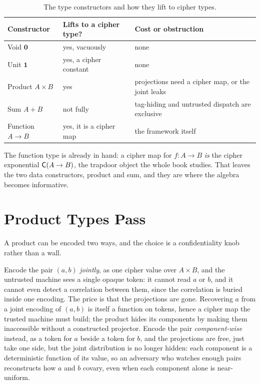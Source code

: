 \begin{table}[t]
\centering
\caption{The type constructors and how they lift to cipher types.}
\label{tab:constructors}
\begin{tabular}{@{}lll@{}}
\toprule
Constructor & Lifts to a cipher type? & Cost or obstruction \\
\midrule
Void $\mathbf{0}$ & yes, vacuously & none \\
Unit $\mathbf{1}$ & yes, a cipher constant & none \\
Product $A \times B$ & yes & projections need a cipher map, or the joint leaks \\
Sum $A + B$ & not fully & tag-hiding and untrusted dispatch are exclusive \\
Function $A \to B$ & yes, it is a cipher map & the framework itself \\
\bottomrule
\end{tabular}
\end{table}

The function type is already in hand: a cipher map for $f : A \to B$
\emph{is} the cipher exponential $\mathsf{C}(A \to B)$, the trapdoor object the
whole book studies. That leaves the two data constructors, product and sum,
and they are where the algebra becomes informative.

\section{Product Types Pass}
\label{sec:product-types}

A product can be encoded two ways, and the choice is a confidentiality knob
rather than a wall.

Encode the pair $(a, b)$ \emph{jointly}, as one cipher value over
$A \times B$, and the untrusted machine sees a single opaque token: it
cannot read $a$ or $b$, and it cannot even detect a correlation between
them, since the correlation is buried inside one encoding. The price is
that the projections are gone. Recovering $a$ from a joint encoding of
$(a, b)$ is itself a function on tokens, hence a cipher map the trusted
machine must build; the product hides its components by making them
inaccessible without a constructed projector. Encode the pair
\emph{component-wise} instead, as a token for $a$ beside a token for $b$,
and the projections are free, just take one side, but the joint distribution
is no longer hidden: each component is a deterministic function of its
value, so an adversary who watches enough pairs reconstructs how $a$ and $b$
covary, even when each component alone is near-uniform.

